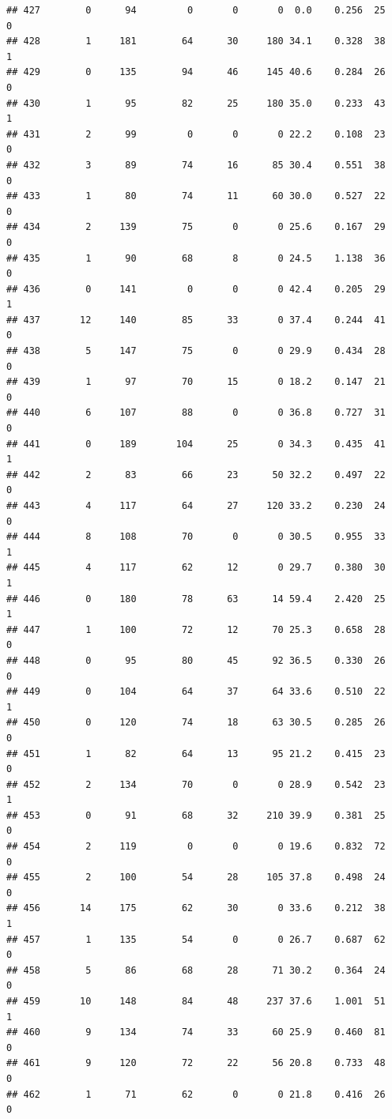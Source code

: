 \documentclass[11pt, a4paper]{article}\usepackage[]{graphicx}\usepackage[]{xcolor}
\makeatletter
\newenvironment{kframe}{%
 \def\at@end@of@kframe{}%
 \ifinner\ifhmode%
  \def\at@end@of@kframe{\end{minipage}}%
  \begin{minipage}{\columnwidth}%
 \fi\fi%
 \def\FrameCommand##1{\hskip\@totalleftmargin \hskip-\fboxsep
 \colorbox{shadecolor}{##1}\hskip-\fboxsep
     \hskip-\linewidth \hskip-\@totalleftmargin \hskip\columnwidth}%
 \MakeFramed {\advance\hsize-\width
   \@totalleftmargin\z@ \linewidth\hsize
   \@setminipage}}%
 {\par\unskip\endMakeFramed%
 \at@end@of@kframe}
\newenvironment{knitrout}{}{} %
\makeatother
\begin{document}
\begin{knitrout}
\begin{kframe}
\begin{verbatim}
## 427        0      94         0       0       0  0.0    0.256  25    0
## 428        1     181        64      30     180 34.1    0.328  38    1
## 429        0     135        94      46     145 40.6    0.284  26    0
## 430        1      95        82      25     180 35.0    0.233  43    1
## 431        2      99         0       0       0 22.2    0.108  23    0
## 432        3      89        74      16      85 30.4    0.551  38    0
## 433        1      80        74      11      60 30.0    0.527  22    0
## 434        2     139        75       0       0 25.6    0.167  29    0
## 435        1      90        68       8       0 24.5    1.138  36    0
## 436        0     141         0       0       0 42.4    0.205  29    1
## 437       12     140        85      33       0 37.4    0.244  41    0
## 438        5     147        75       0       0 29.9    0.434  28    0
## 439        1      97        70      15       0 18.2    0.147  21    0
## 440        6     107        88       0       0 36.8    0.727  31    0
## 441        0     189       104      25       0 34.3    0.435  41    1
## 442        2      83        66      23      50 32.2    0.497  22    0
## 443        4     117        64      27     120 33.2    0.230  24    0
## 444        8     108        70       0       0 30.5    0.955  33    1
## 445        4     117        62      12       0 29.7    0.380  30    1
## 446        0     180        78      63      14 59.4    2.420  25    1
## 447        1     100        72      12      70 25.3    0.658  28    0
## 448        0      95        80      45      92 36.5    0.330  26    0
## 449        0     104        64      37      64 33.6    0.510  22    1
## 450        0     120        74      18      63 30.5    0.285  26    0
## 451        1      82        64      13      95 21.2    0.415  23    0
## 452        2     134        70       0       0 28.9    0.542  23    1
## 453        0      91        68      32     210 39.9    0.381  25    0
## 454        2     119         0       0       0 19.6    0.832  72    0
## 455        2     100        54      28     105 37.8    0.498  24    0
## 456       14     175        62      30       0 33.6    0.212  38    1
## 457        1     135        54       0       0 26.7    0.687  62    0
## 458        5      86        68      28      71 30.2    0.364  24    0
## 459       10     148        84      48     237 37.6    1.001  51    1
## 460        9     134        74      33      60 25.9    0.460  81    0
## 461        9     120        72      22      56 20.8    0.733  48    0
## 462        1      71        62       0       0 21.8    0.416  26    0

\end{verbatim}
\end{kframe}
\end{knitrout}
\end{document}
